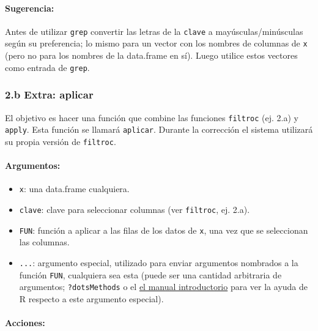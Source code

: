 \documentclass[]{article}
\begin{document}
\paragraph{Sugerencia:}

Antes de utilizar \texttt{grep} convertir las letras de la
\texttt{clave} a mayúsculas/minúsculas según su preferencia; lo mismo
para un vector con los nombres de columnas de \texttt{x} (pero no para
los nombres de la data.frame en sí). Luego utilice estos vectores como
entrada de \texttt{grep}.

\subsubsection{2.b Extra: aplicar}

El objetivo es hacer una función que combine las funciones
\texttt{filtroc} (ej. 2.a) y \texttt{apply}. Esta función se llamará
\texttt{aplicar}. Durante la corrección el sistema utilizará su propia
versión de \texttt{filtroc}.

\paragraph{Argumentos:}

\begin{itemize}
\item
  \texttt{x}: una data.frame cualquiera.
\item
  \texttt{clave}: clave para seleccionar columnas (ver \texttt{filtroc},
  ej. 2.a).
\item
  \texttt{FUN}: función a aplicar a las filas de los datos de
  \texttt{x}, una vez que se seleccionan las columnas.
\item
  \texttt{...}: argumento especial, utilizado para enviar argumentos
  nombrados a la función \texttt{FUN}, cualquiera sea esta (puede ser
  una cantidad arbitraria de argumentos; \texttt{?dotsMethods} o el
  \href{http://cran.r-project.org/doc/manuals/r-release/R-intro.html\#The-three-dots-argument}{el
  manual introductorio} para ver la ayuda de R respecto a este argumento
  especial).
\end{itemize}
\paragraph{Acciones:}
\end{document}
